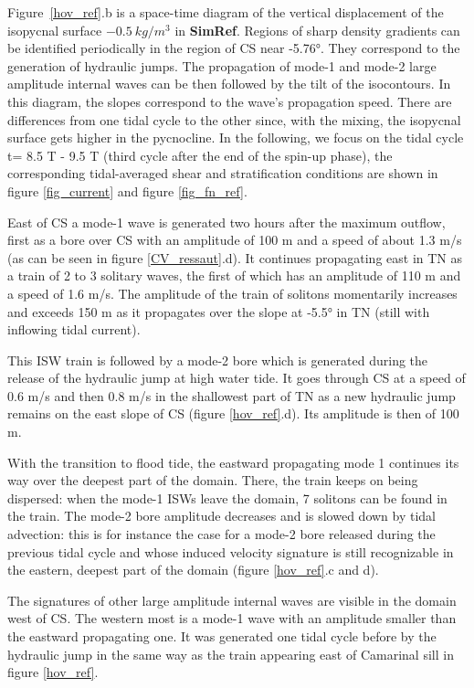 \indent Figure\ \ref{hov_ref}.b is a space-time diagram of the vertical displacement of the isopycnal surface $-0.5\  kg/m^3$ in \textbf{SimRef}. Regions of sharp density gradients can be identified periodically in the region of CS near -5.76°. They correspond to the generation of hydraulic jumps. The propagation of mode-1 and mode-2 large amplitude internal waves can be then followed by the tilt of the isocontours. In this diagram, the slopes correspond to the wave's propagation speed. There are differences from one tidal cycle to the other since, with the mixing, the isopycnal surface gets higher in the pycnocline. In the following, we focus on the tidal cycle t= 8.5 T - 9.5 T (third cycle after the end of the spin-up phase), the corresponding tidal-averaged shear and stratification conditions are shown in figure \ref{fig_current} and figure \ref{fig_fn_ref}.

East of CS a mode-1 wave is generated two hours after the maximum outflow, first as a bore over CS with an amplitude of 100 m and a speed of about 1.3 m/s (as can be seen in figure \ref{CV_ressaut}.d). It continues propagating east in TN as a train of 2 to 3 solitary waves, the first of which has an amplitude of 110 m and a speed of 1.6 m/s. The amplitude of the train of solitons momentarily increases and exceeds 150 m as it propagates over the slope at -5.5° in TN (still with inflowing tidal current).

This ISW train is followed by a mode-2 bore which is generated during the release of the hydraulic jump at high water tide. It goes through CS at a speed of 0.6 m/s and then 0.8 m/s in the shallowest part of TN as a new hydraulic jump remains on the east slope of CS (figure \ref{hov_ref}.d). Its amplitude is then of 100 m. 

With the transition to flood tide, the eastward propagating mode 1 continues its way over the deepest part of the domain. There, the train keeps on being dispersed: when the mode-1 ISWs leave the domain, 7 solitons can be found in the train. The mode-2 bore amplitude decreases and is slowed down by tidal advection: this is for instance the case for a mode-2 bore released during the previous tidal cycle and whose induced velocity signature is still recognizable in the eastern, deepest part of the domain (figure \ref{hov_ref}.c and d).

The signatures of other large amplitude internal waves are visible in the domain west of CS. The western most is a mode-1 wave with an amplitude smaller than the eastward propagating one. It was generated one tidal cycle before by the hydraulic jump in the same way as the train appearing east of Camarinal sill in figure \ref{hov_ref}.

